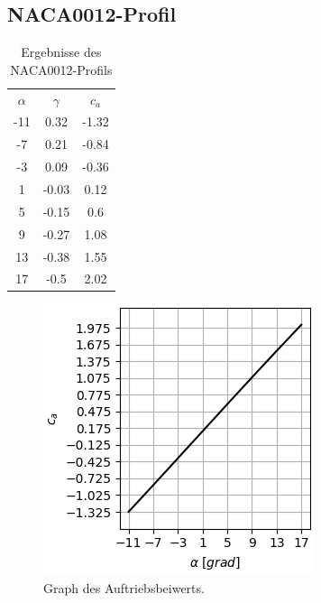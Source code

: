 \newpage
\subsection{NACA0012-Profil} 
\begin{minipage}{0.45\textwidth}
\begin{table}[H]
    \centering
    \begin{tabular}{c|cc}
    $\alpha$ & $\gamma$ & $c_a$ \\
        -11 & 0.32 & -1.32 \\ 
-7 & 0.21 & -0.84 \\ 
-3 & 0.09 & -0.36 \\ 
1 & -0.03 & 0.12 \\ 
5 & -0.15 & 0.6 \\ 
9 & -0.27 & 1.08 \\ 
13 & -0.38 & 1.55 \\ 
17 & -0.5 & 2.02 \\ 

    \end{tabular}
    \label{tab:naca}
    \caption{Ergebnisse des NACA0012-Profils}
\end{table}
\end{minipage}
\hfill
\begin{minipage}{0.45\textwidth}
\begin{figure}[H]
    \centering
    \includegraphics[scale=0.6]{figures/nacaca.png}
    \caption{Graph des Auftriebsbeiwerts.}
    \label{fig:nacaca}
\end{figure}
\end{minipage}

